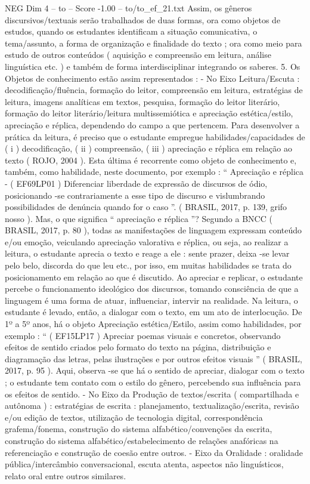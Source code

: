 \begin{textsample}{NEG Dim 4 – to – Score -1.00 – to/to\_ef\_21.txt}
Assim, os gêneros discursivos/textuais serão trabalhados de duas formas, ora como objetos de estudos, quando os estudantes identificam a situação comunicativa, o tema/assunto, a forma de organização e finalidade do texto ; ora como meio para estudo de outros conteúdos ( aquisição e compreensão em leitura, análise linguística etc. ) e também de forma interdisciplinar integrando os saberes. 5.
Os Objetos de conhecimento estão assim representados : - No Eixo Leitura/Escuta : decodificação/fluência, formação do leitor, compreensão em leitura, estratégias de leitura, imagens analíticas em textos, pesquisa, formação do leitor literário, formação do leitor literário/leitura multissemiótica e apreciação estética/estilo, apreciação e réplica, dependendo do campo a que pertencem.
Para desenvolver a prática da leitura, é preciso que o estudante empregue habilidades/capacidades de ( i ) decodificação, ( ii ) compreensão, ( iii ) apreciação e réplica em relação ao texto ( ROJO, 2004 ).
Esta última é recorrente como objeto de conhecimento e, também, como habilidade, neste documento, por exemplo : “ Apreciação e réplica - ( EF69LP01 ) Diferenciar liberdade de expressão de discursos de ódio, posicionando -se contrariamente a esse tipo de discurso e vislumbrando possibilidades de denúncia quando for o caso ”. ( BRASIL, 2017, p. 139, grifo nosso ).
Mas, o que significa “ apreciação e réplica ”?
Segundo a BNCC ( BRASIL, 2017, p. 80 ), todas as manifestações de linguagem expressam conteúdo e/ou emoção, veiculando apreciação valorativa e réplica, ou seja, ao realizar a leitura, o estudante aprecia o texto e reage a ele : sente prazer, deixa -se levar pelo belo, discorda do que leu etc., por isso, em muitas habilidades se trata do posicionamento em relação ao que é discutido.
Ao apreciar e replicar, o estudante percebe o funcionamento ideológico dos discursos, tomando consciência de que a linguagem é uma forma de atuar, influenciar, intervir na realidade.
Na leitura, o estudante é levado, então, a dialogar com o texto, em um ato de interlocução.
De 1º a 5º anos, há o objeto Apreciação estética/Estilo, assim como habilidades, por exemplo : “ ( EF15LP17 ) Apreciar poemas visuais e concretos, observando efeitos de sentido criados pelo formato do texto na página, distribuição e diagramação das letras, pelas ilustrações e por outros efeitos visuais ” ( BRASIL, 2017, p. 95 ).
Aqui, observa -se que há o sentido de apreciar, dialogar com o texto ; o estudante tem contato com o estilo do gênero, percebendo sua influência para os efeitos de sentido. - No Eixo da Produção de textos/escrita ( compartilhada e autônoma ) : estratégias de escrita : planejamento, textualização/escrita, revisão e/ou edição de textos, utilização de tecnologia digital, correspondência grafema/fonema, construção do sistema alfabético/convenções da escrita, construção do sistema alfabético/estabelecimento de relações anafóricas na referenciação e construção de coesão entre outros. - Eixo da Oralidade : oralidade pública/intercâmbio conversacional, escuta atenta, aspectos não linguísticos, relato oral entre outros similares.

\end{textsample}

